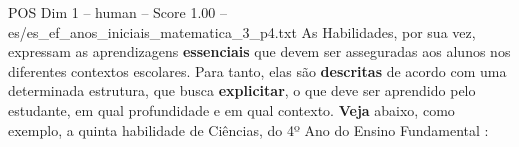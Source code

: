 \begin{textsample}{POS Dim 1 – human – Score 1.00 – es/es\_ef\_anos\_iniciais\_matematica\_3\_p4.txt}  \label{ex:f1_pos_013}
As Habilidades, por sua vez, expressam as aprendizagens \textbf{essenciais} que devem ser asseguradas aos alunos nos diferentes contextos escolares.
Para tanto, elas são \textbf{descritas} de acordo com uma determinada estrutura, que busca \textbf{explicitar}, o que deve ser aprendido pelo estudante, em qual profundidade e em qual contexto. \textbf{Veja} abaixo, como exemplo, a quinta habilidade de Ciências, do 4º Ano do Ensino Fundamental :

\end{textsample}
